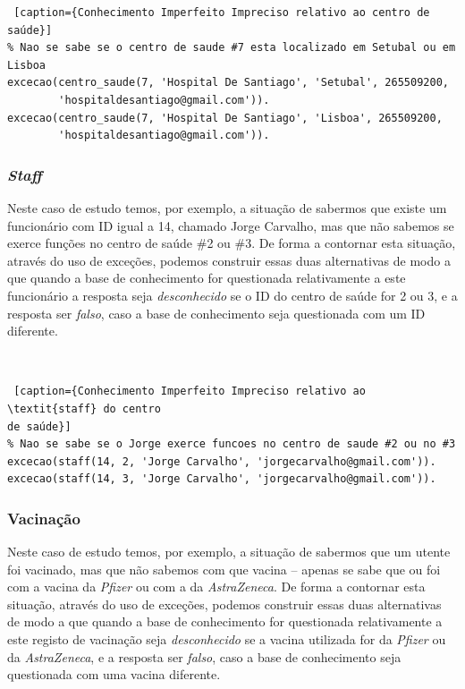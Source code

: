 \documentclass[a4paper, 11pt]{article}
\begin{document}
\pagebreak

\begin{lstlisting} [caption={Conhecimento Imperfeito Impreciso relativo ao centro de saúde}]
% Nao se sabe se o centro de saude #7 esta localizado em Setubal ou em Lisboa
excecao(centro_saude(7, 'Hospital De Santiago', 'Setubal', 265509200,
        'hospitaldesantiago@gmail.com')).
excecao(centro_saude(7, 'Hospital De Santiago', 'Lisboa', 265509200,
        'hospitaldesantiago@gmail.com')).
\end{lstlisting}

\subsubsection*{\textit{Staff}}

Neste caso de estudo temos, por exemplo, a situação de sabermos que existe
um funcionário com ID igual a 14, chamado Jorge Carvalho, mas que não sabemos se exerce funções 
no centro de saúde \#2 ou \#3. De forma a contornar esta situação, através do uso de
exceções, podemos construir essas duas alternativas de modo a que quando a base de
conhecimento for questionada relativamente a este funcionário a resposta seja 
\textit{desconhecido} se o ID do centro de saúde for 2 ou 3, e a resposta ser \textit{falso}, caso 
a
base de conhecimento seja questionada com um ID diferente.

\

\begin{lstlisting} [caption={Conhecimento Imperfeito Impreciso relativo ao \textit{staff} do centro 
de saúde}]
% Nao se sabe se o Jorge exerce funcoes no centro de saude #2 ou no #3
excecao(staff(14, 2, 'Jorge Carvalho', 'jorgecarvalho@gmail.com')).
excecao(staff(14, 3, 'Jorge Carvalho', 'jorgecarvalho@gmail.com')).
\end{lstlisting}


\subsubsection*{Vacinação}

Neste caso de estudo temos, por exemplo, a situação de sabermos que um utente foi vacinado, mas 
que não sabemos com que vacina -- apenas se sabe que ou foi com a vacina da \textit{Pfizer} ou com 
a da \textit{AstraZeneca}. De forma a contornar esta situação, através do uso de
exceções, podemos construir essas duas alternativas de modo a que quando a base de
conhecimento for questionada relativamente a este registo de vacinação seja \textit{desconhecido} 
se a vacina utilizada for da \textit{Pfizer} ou da \textit{AstraZeneca}, e a resposta ser 
\textit{falso}, caso a
base de conhecimento seja questionada com uma vacina diferente.
\end{document}
